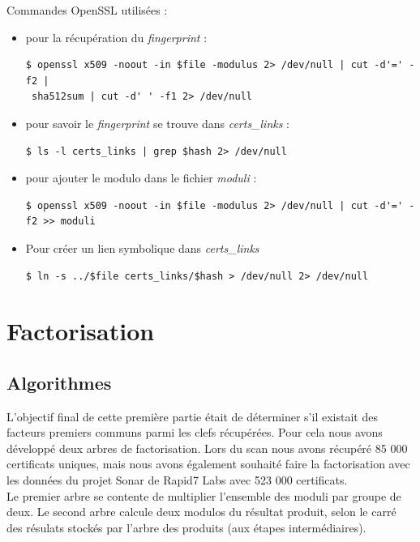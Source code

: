 Commandes OpenSSL utilisées :
\begin{itemize}
\item pour la récupération du \textit{fingerprint} :
\begin{verbatim} 
$ openssl x509 -noout -in $file -modulus 2> /dev/null | cut -d'=' -f2 |
 sha512sum | cut -d' ' -f1 2> /dev/null 
\end{verbatim}

\item pour savoir le \textit{fingerprint} se trouve dans \textit{certs\_links} :
\begin{verbatim} 
$ ls -l certs_links | grep $hash 2> /dev/null
\end{verbatim}

\item pour ajouter le modulo dans le fichier \textit{moduli} :
\begin{verbatim} 
$ openssl x509 -noout -in $file -modulus 2> /dev/null | cut -d'=' -f2 >> moduli 
\end{verbatim}

\item Pour créer un lien symbolique dans \textit{certs\_links}
\begin{verbatim} 
$ ln -s ../$file certs_links/$hash > /dev/null 2> /dev/null
\end{verbatim}
\end{itemize}


\section{Factorisation}



\subsection{Algorithmes}

L'objectif final de cette première partie était de déterminer s'il existait des facteurs premiers communs parmi les clefs récupérées. Pour cela nous avons développé deux arbres de factorisation.
Lors du scan nous avons récupéré 85 000 certificats uniques, mais nous avons également souhaité faire la factorisation avec les données du projet Sonar de Rapid7 Labs avec 523 000 certificats.\\


Le premier arbre se contente de multiplier l'ensemble des moduli par groupe de deux.
Le second arbre calcule deux modulos du résultat produit, selon le carré des résulats stockés par l'arbre des produits (aux étapes intermédiaires).\\



